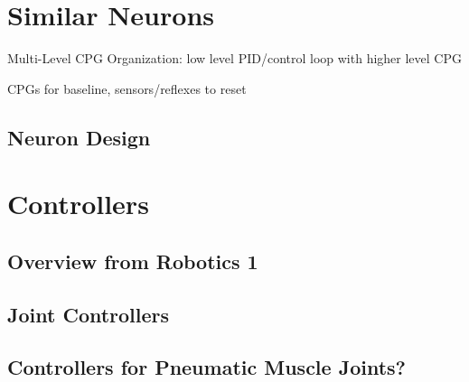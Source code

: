 \cite{einstein}

\section{Similar Neurons}

Multi-Level CPG Organization: low level PID/control loop with higher level CPG
\cite{MultiLevelCPG}

CPGs for baseline, sensors/reflexes to reset \cite{SixLeggedWalking}

\subsection{Neuron Design}

\section{Controllers}

\subsection{Overview from Robotics 1}

\subsection{Joint Controllers}

\subsection{Controllers for Pneumatic Muscle Joints?}

